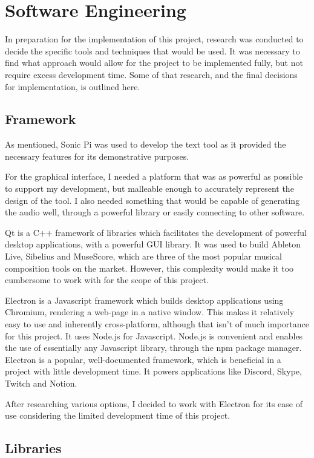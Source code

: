\documentclass[12pt,a4paper,oneside,openright]{report}
\begin{document}
\section{Software Engineering}
In preparation for the implementation of this project, research was conducted to decide the specific tools and techniques that would be used. It was necessary to find what approach would allow for the project to be implemented fully, but not require excess development time. Some of that research, and the final decisions for implementation, is outlined here.

\subsection{Framework}
As mentioned, Sonic Pi was used to develop the text tool as it provided the necessary features for its demonstrative purposes.

For the graphical interface, I needed a platform that was as powerful as possible to support my development, but malleable enough to accurately represent the design of the tool. I also needed something that would be capable of generating the audio well, through a powerful library or easily connecting to other software.

Qt is a C++ framework of libraries which facilitates the development of powerful desktop applications, with a powerful GUI library. It was used to build Ableton Live, Sibelius and MuseScore, which are three of the most popular musical composition tools on the market. However, this complexity would make it too cumbersome to work with for the scope of this project.

Electron is a Javascript framework which builds desktop applications using Chromium, rendering a web-page in a native window. This makes it relatively easy to use and inherently cross-platform, although that isn't of much importance for this project. It uses Node.js for Javascript. Node.js is convenient and enables the use of essentially any Javascript library, through the npm package manager. Electron is a popular, well-documented framework, which is beneficial in a project with little development time. It powers applications like Discord, Skype, Twitch and Notion.

After researching various options, I decided to work with Electron for its ease of use considering the limited development time of this project.

\subsection{Libraries}
\end{document}
